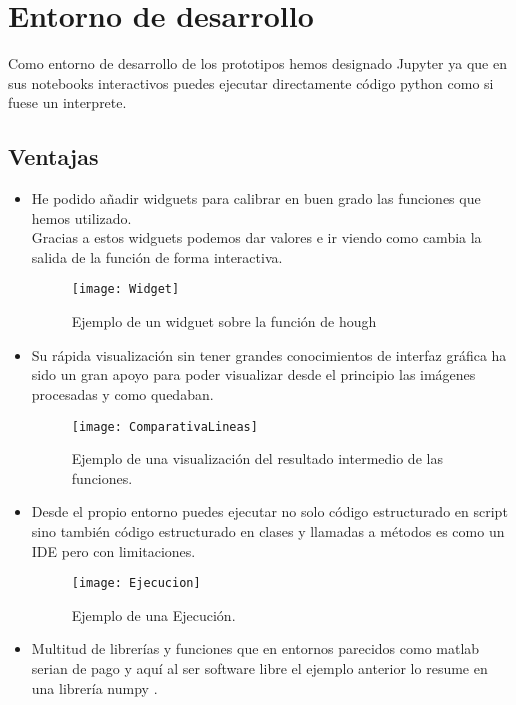 
\section{Entorno de desarrollo}
Como entorno de desarrollo de los prototipos hemos designado Jupyter ya que en sus notebooks interactivos puedes ejecutar directamente código python como si fuese un interprete.\\

\subsection{Ventajas}
\begin{itemize}
\item He podido añadir widguets para calibrar en buen grado las funciones que hemos utilizado.\\
Gracias a estos widguets podemos dar valores e ir viendo como cambia la salida de la función de forma interactiva.

\begin{figure}[h]
\centering
\texttt{[image: Widget]}
\caption{Ejemplo de un widguet sobre la función de hough}
\end{figure}

\item Su rápida visualización sin tener grandes conocimientos de interfaz gráfica ha sido un gran apoyo para poder visualizar desde el principio las imágenes procesadas y como quedaban.\\ 

\begin{figure}[h]
\centering
\texttt{[image: ComparativaLineas]}
\caption{Ejemplo de una visualización del resultado intermedio de las funciones.}
\end{figure}

\item Desde el propio entorno puedes ejecutar no solo código estructurado en script sino también código estructurado en clases y llamadas a métodos es como un IDE pero con limitaciones.

\begin{figure}[h]
\centering
\texttt{[image: Ejecucion]}
\caption{Ejemplo de una Ejecución.}
\end{figure}

\item Multitud de librerías y funciones que en entornos parecidos como matlab serian de pago y aquí al ser software libre el ejemplo anterior lo resume en una librería numpy \cite{Numpy}.
\end{itemize}

